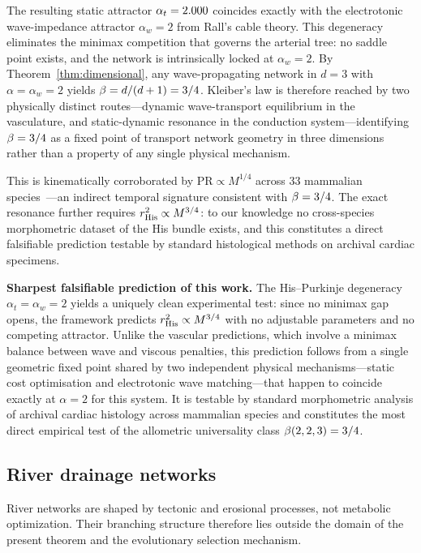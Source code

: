 \documentclass[11pt,a4paper]{article}
\theoremstyle{remark}
\begin{document}
The resulting static attractor $\alpha_t = 2.000{}$ coincides exactly with the
electrotonic wave-impedance attractor $\alpha_w = 2$ from Rall's cable theory.
This degeneracy eliminates the minimax competition that governs the arterial
tree: no saddle point exists, and the network is intrinsically locked at
$\alpha_w = 2$. By Theorem~\ref{thm:dimensional}, any wave-propagating network in $d = 3$ with
$\alpha = \alpha_w = 2$ yields $\beta = d/(d+1) = 3/4{}$. Kleiber's law
is therefore reached by two physically distinct routes---dynamic wave-transport
equilibrium in the vasculature, and static-dynamic resonance in the conduction
system---identifying $\beta = 3/4{}$ as a fixed point of transport
network geometry in three dimensions rather than a property of any single
physical mechanism.

This is kinematically corroborated by $\mathrm{PR} \propto M^{1/4}$ across 33
mammalian species~\cite{noujaim2004}---an indirect temporal signature consistent
with $\beta = 3/4{}$. The exact resonance further requires
$r^2_{\mathrm{His}} \propto M^{3/4{}}$: to our knowledge no
cross-species morphometric dataset of the His bundle exists, and this
constitutes a direct falsifiable prediction testable by standard histological
methods on archival cardiac specimens.

\noindent\textbf{Sharpest falsifiable prediction of this work.} The His--Purkinje
degeneracy $\alpha_t = \alpha_w = 2$ yields a uniquely clean experimental
test: since no minimax gap opens, the framework predicts
$r^2_{\mathrm{His}} \propto M^{3/4{}}$ with no adjustable parameters and no
competing attractor. Unlike the vascular predictions, which involve a
minimax balance between wave and viscous penalties, this prediction follows
from a single geometric fixed point shared by two independent physical
mechanisms---static cost optimisation and electrotonic wave matching---that
happen to coincide exactly at $\alpha = 2$ for this system. It is testable
by standard morphometric analysis of archival cardiac histology across
mammalian species and constitutes the most direct empirical test of the
allometric universality class $\beta(2, 2, 3) = 3/4{}$.

\subsection{River drainage networks}
River networks are shaped by tectonic and erosional processes, not metabolic
optimization. Their branching structure therefore lies outside the domain of the
present theorem and the evolutionary selection mechanism.
\end{document}
